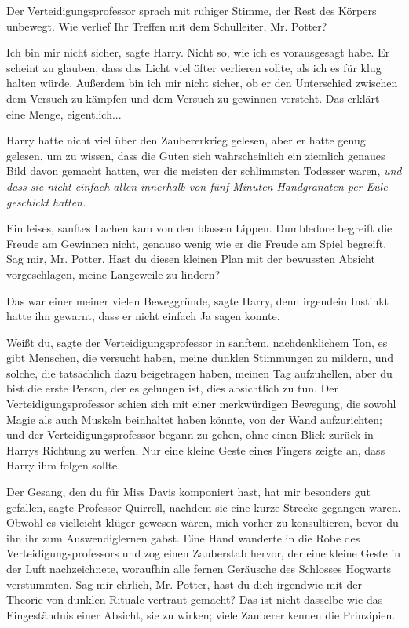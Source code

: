 Der Verteidigungsprofessor sprach mit ruhiger Stimme, der Rest des Körpers
unbewegt. \glqq{}Wie verlief Ihr Treffen mit dem Schulleiter, Mr. Potter?\grqq{}

\glqq{}Ich bin mir nicht sicher\grqq{}, sagte Harry. \glqq{}Nicht so, wie ich es
vorausgesagt habe. Er scheint zu glauben, dass das Licht viel öfter verlieren
sollte, als ich es für klug halten würde. Außerdem bin ich mir nicht sicher, ob
er den Unterschied zwischen dem Versuch zu kämpfen und dem Versuch zu gewinnen
versteht. Das erklärt eine Menge, eigentlich...\grqq{}

Harry hatte nicht viel über den Zaubererkrieg gelesen, aber er hatte genug
gelesen, um zu wissen, dass die Guten sich wahrscheinlich ein ziemlich genaues
Bild davon gemacht hatten, wer die meisten der schlimmsten Todesser waren,
\emph{und dass sie nicht einfach allen innerhalb von fünf Minuten Handgranaten
per Eule geschickt hatten.}

Ein leises, sanftes Lachen kam von den blassen Lippen. \glqq{}Dumbledore begreift
die Freude am Gewinnen nicht, genauso wenig wie er die Freude am Spiel begreift.
Sag mir, Mr. Potter. Hast du diesen kleinen Plan mit der bewussten Absicht
vorgeschlagen, meine Langeweile zu lindern?\grqq{}

\glqq{}Das war einer meiner vielen Beweggründe\grqq{}, sagte Harry, denn
irgendein Instinkt hatte ihn gewarnt, dass er nicht einfach Ja sagen konnte.

\glqq{}Weißt du\grqq{}, sagte der Verteidigungsprofessor in sanftem,
nachdenklichem Ton, \glqq{}es gibt Menschen, die versucht haben, meine dunklen
Stimmungen zu mildern, und solche, die tatsächlich dazu beigetragen haben,
meinen Tag aufzuhellen, aber du bist die erste Person, der es gelungen ist, dies
absichtlich zu tun.\grqq{} Der Verteidigungsprofessor schien sich mit einer
merkwürdigen Bewegung, die sowohl Magie als auch Muskeln beinhaltet haben
könnte, von der Wand aufzurichten; und der Verteidigungsprofessor begann zu
gehen, ohne einen Blick zurück in Harrys Richtung zu werfen. Nur eine kleine
Geste eines Fingers zeigte an, dass Harry ihm folgen sollte.

\glqq{}Der Gesang, den du für Miss Davis komponiert hast, hat mir besonders gut
gefallen\grqq{}, sagte Professor Quirrell, nachdem sie eine kurze Strecke
gegangen waren. \glqq{}Obwohl es vielleicht klüger gewesen wären, mich vorher zu
konsultieren, bevor du ihn ihr zum Auswendiglernen gabst.\grqq{} Eine Hand
wanderte in die Robe des Verteidigungsprofessors und zog einen Zauberstab
hervor, der eine kleine Geste in der Luft nachzeichnete, woraufhin alle fernen
Geräusche des Schlosses Hogwarts verstummten. \glqq{}Sag mir ehrlich, Mr. Potter,
hast du dich irgendwie mit der Theorie von dunklen Rituale vertraut gemacht? Das
ist nicht dasselbe wie das Eingeständnis einer Absicht, sie zu wirken; viele
Zauberer kennen die Prinzipien.\grqq{}


